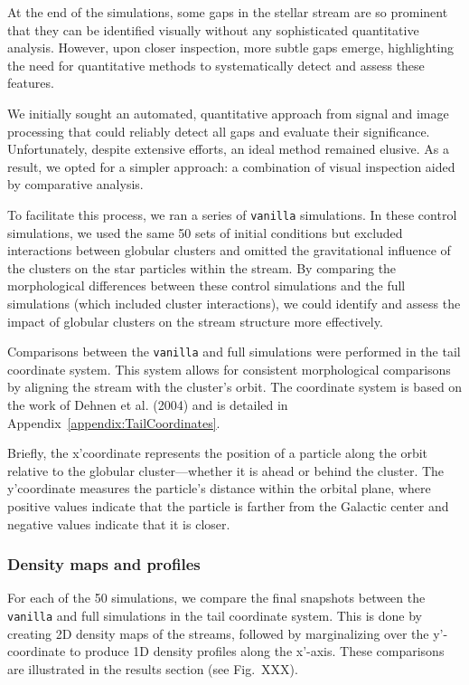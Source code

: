 \documentclass[draft]{aa}
\begin{document}
    At the end of the simulations, some gaps in the stellar stream are so prominent that they can be identified visually without any sophisticated quantitative analysis. However, upon closer inspection, more subtle gaps emerge, highlighting the need for quantitative methods to systematically detect and assess these features.

    We initially sought an automated, quantitative approach from signal and image processing that could reliably detect all gaps and evaluate their significance. Unfortunately, despite extensive efforts, an ideal method remained elusive. As a result, we opted for a simpler approach: a combination of visual inspection aided by comparative analysis.

    To facilitate this process, we ran a series of \texttt{vanilla} simulations. In these control simulations, we used the same 50 sets of initial conditions but excluded interactions between globular clusters and omitted the gravitational influence of the clusters on the star particles within the stream. By comparing the morphological differences between these control simulations and the full simulations (which included cluster interactions), we could identify and assess the impact of globular clusters on the stream structure more effectively.


    Comparisons between the \texttt{vanilla} and full simulations  were performed in the tail coordinate system. This system allows for consistent morphological comparisons by aligning the stream with the cluster's orbit. The coordinate system is based on the work of Dehnen et al. (2004) and is detailed in Appendix~\ref{appendix:TailCoordinates}.

    Briefly, the x'coordinate represents the position of a particle along the orbit relative to the globular cluster—whether it is ahead or behind the cluster. The y'coordinate measures the particle's distance within the orbital plane, where positive values indicate that the particle is farther from the Galactic center and negative values indicate that it is closer.

    \subsubsection*{Density maps and profiles}
      For each of the 50 simulations, we compare the final snapshots between the \texttt{vanilla} and full simulations in the tail coordinate system. This is done by creating 2D density maps of the streams, followed by marginalizing over the y'-coordinate to produce 1D density profiles along the x'-axis. These comparisons are illustrated in the results section (see Fig.~XXX).
\end{document}
